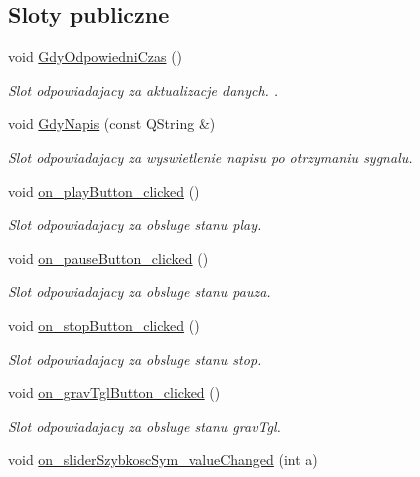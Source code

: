 \subsection*{Sloty publiczne}
\begin{DoxyCompactItemize}
\item 
void \hyperlink{class_okno_glowne_a2a49d3696ef8a42325313842768f2c92}{Gdy\+Odpowiedni\+Czas} ()
\begin{DoxyCompactList}\small\item\em Slot odpowiadajacy za aktualizacje danych. . \end{DoxyCompactList}\item 
void \hyperlink{class_okno_glowne_a2a59f13292adfead4ac821780220044a}{Gdy\+Napis} (const Q\+String \&)
\begin{DoxyCompactList}\small\item\em Slot odpowiadajacy za wyswietlenie napisu po otrzymaniu sygnalu. \end{DoxyCompactList}\item 
void \hyperlink{class_okno_glowne_ac837b1f8c8b0288d07987e059966431b}{on\+\_\+play\+Button\+\_\+clicked} ()
\begin{DoxyCompactList}\small\item\em Slot odpowiadajacy za obsluge stanu play. \end{DoxyCompactList}\item 
void \hyperlink{class_okno_glowne_ae8bd560de9aa835ba8b194b8f7da094c}{on\+\_\+pause\+Button\+\_\+clicked} ()
\begin{DoxyCompactList}\small\item\em Slot odpowiadajacy za obsluge stanu pauza. \end{DoxyCompactList}\item 
void \hyperlink{class_okno_glowne_a63255adc6263a1ee6f67c96b91446b73}{on\+\_\+stop\+Button\+\_\+clicked} ()
\begin{DoxyCompactList}\small\item\em Slot odpowiadajacy za obsluge stanu stop. \end{DoxyCompactList}\item 
void \hyperlink{class_okno_glowne_a0c07c0f31c7b79e053ffb6e606ff5293}{on\+\_\+grav\+Tgl\+Button\+\_\+clicked} ()
\begin{DoxyCompactList}\small\item\em Slot odpowiadajacy za obsluge stanu grav\+Tgl. \end{DoxyCompactList}\item 
void \hyperlink{class_okno_glowne_a726ce3fbe89c3fb7364c39e99c0ad658}{on\+\_\+slider\+Szybkosc\+Sym\+\_\+value\+Changed} (int a)

\end{DoxyCompactItemize}

